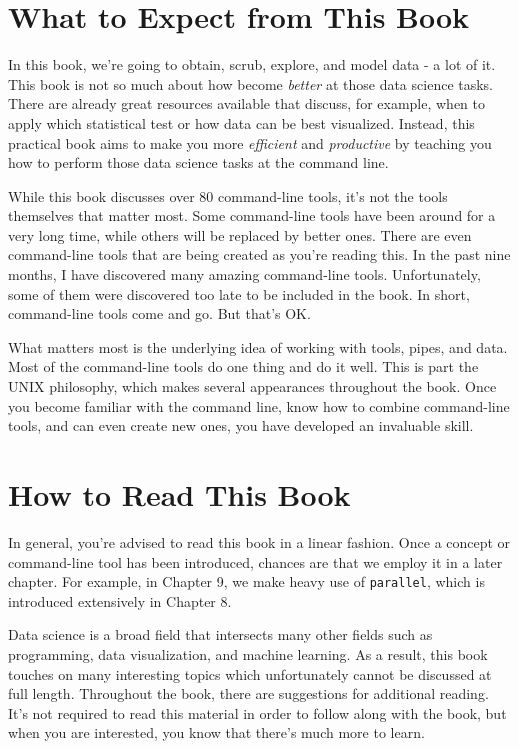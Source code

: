 \documentclass[
]{book}
\theoremstyle{definition}
\theoremstyle{definition}
\theoremstyle{definition}
\theoremstyle{remark}
\begin{document}
\hypertarget{what-to-expect-from-this-book}{%
\section*{What to Expect from This Book}\label{what-to-expect-from-this-book}}

In this book, we're going to obtain, scrub, explore, and model data - a lot of it. This book is not so much about how become \emph{better} at those data science tasks. There are already great resources available that discuss, for example, when to apply which statistical test or how data can be best visualized. Instead, this practical book aims to make you more \emph{efficient} and \emph{productive} by teaching you how to perform those data science tasks at the command line.

While this book discusses over 80 command-line tools, it's not the tools themselves that matter most. Some command-line tools have been around for a very long time, while others will be replaced by better ones. There are even command-line tools that are being created as you're reading this. In the past nine months, I have discovered many amazing command-line tools. Unfortunately, some of them were discovered too late to be included in the book. In short, command-line tools come and go. But that's OK.

What matters most is the underlying idea of working with tools, pipes, and data. Most of the command-line tools do one thing and do it well. This is part the UNIX philosophy, which makes several appearances throughout the book. Once you become familiar with the command line, know how to combine command-line tools, and can even create new ones, you have developed an invaluable skill.

\hypertarget{how-to-read-this-book}{%
\section*{How to Read This Book}\label{how-to-read-this-book}}

In general, you're advised to read this book in a linear fashion. Once a concept or command-line tool has been introduced, chances are that we employ it in a later chapter. For example, in Chapter 9, we make heavy use of \texttt{parallel}, which is introduced extensively in Chapter 8.

Data science is a broad field that intersects many other fields such as programming, data visualization, and machine learning. As a result, this book touches on many interesting topics which unfortunately cannot be discussed at full length. Throughout the book, there are suggestions for additional reading. It's not required to read this material in order to follow along with the book, but when you are interested, you know that there's much more to learn.
\end{document}
